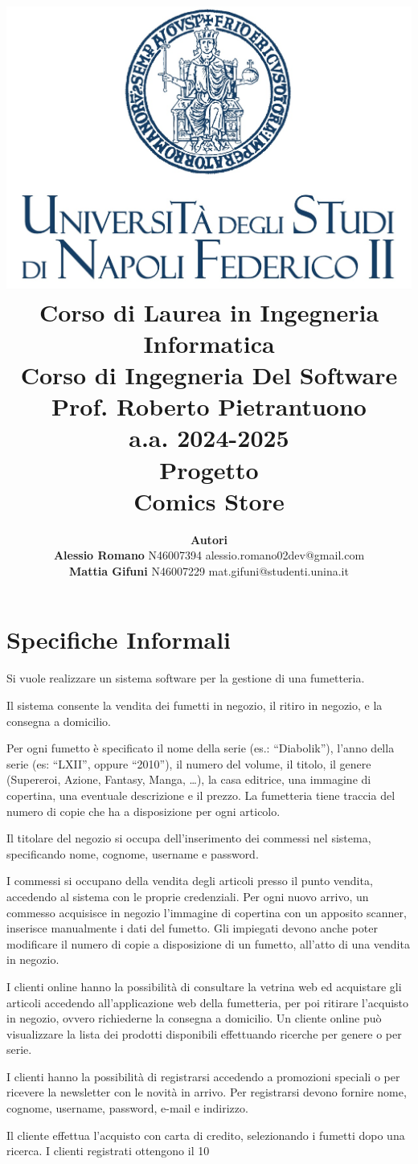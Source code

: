 \documentclass[12pt, a4paper]{article}
\title{\texorpdfstring{%
    \includegraphics[scale=0.3]{./public/unina-logo.jpg}\\ \vspace{0.5cm}%
    Corso di Laurea in Ingegneria Informatica\\%
    \vspace{0.5cm}
    Corso di Ingegneria Del Software\\%
    Prof. \textbf{Roberto Pietrantuono}\\%
    a.a. 2024-2025 \\
    \vspace{0.5cm}
    Progetto \\
    \textbf{Comics Store}
}{Corso di Laurea in Ingegneria Informatica}}
\author{\textbf{Autori}\\ \textbf{Alessio Romano} N46007394 alessio.romano02dev@gmail.com \\ \textbf{Mattia Gifuni} N46007229 mat.gifuni@studenti.unina.it}
\begin{document}
\maketitle

\newpage
\tableofcontents
\newpage

\section{Specifiche Informali}
Si vuole realizzare un sistema software per la gestione di una fumetteria.

Il sistema consente la vendita dei fumetti in negozio, il ritiro in negozio, e la consegna a domicilio.

Per ogni fumetto è specificato il nome della serie (es.: “Diabolik”), l’anno della serie (es: “LXII”, oppure “2010”), il numero del volume, il titolo, il genere (Supereroi, Azione, Fantasy, Manga, …), la casa editrice, una immagine di copertina, una eventuale descrizione e il prezzo. La fumetteria tiene traccia del numero di copie che ha a disposizione per ogni articolo.

Il titolare del negozio si occupa dell’inserimento dei commessi nel sistema, specificando nome, cognome, username e password.

I commessi si occupano della vendita degli articoli presso il punto vendita, accedendo al sistema con le proprie credenziali. Per ogni nuovo arrivo, un commesso acquisisce in negozio l’immagine di copertina con un apposito scanner, inserisce manualmente i dati del fumetto. Gli impiegati devono anche poter modificare il numero di copie a disposizione di un fumetto, all’atto di una vendita in negozio.

I clienti online hanno la possibilità di consultare la vetrina web ed acquistare gli articoli accedendo all’applicazione web della fumetteria, per poi ritirare l’acquisto in negozio, ovvero richiederne la consegna a domicilio. Un cliente online può visualizzare la lista dei prodotti disponibili effettuando ricerche per genere o per serie.

I clienti hanno la possibilità di registrarsi accedendo a promozioni speciali o per ricevere la newsletter con le novità in arrivo. Per registrarsi devono fornire nome, cognome, username, password, e-mail e indirizzo.

Il cliente effettua l’acquisto con carta di credito, selezionando i fumetti dopo una ricerca. I clienti registrati ottengono il 10%
\end{document}
